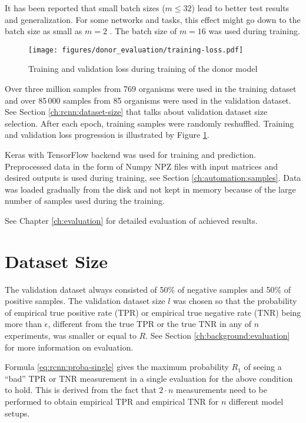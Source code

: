 It has been reported that small batch sizes ($m \le 32$) lead to better test
results and generalization. For some networks and tasks, this effect might go
down to the batch size as small as $m = 2$ \cite{masters2018revisitingb}. The
batch size of $m = 16$ was used during training.

\begin{figure}
  \centering
  \texttt{[image: figures/donor\_evaluation/training-loss.pdf]}
  \caption{Training and validation loss during training of the donor model}
  \label{fig:rcnn:training-loss}
\end{figure}

Over three million samples from 769 organisms were used in the training dataset
and over 85\,000 samples from 85 organisms were used in the validation dataset.
See Section \ref{ch:rcnn:dataset-size} that talks about validation dataset size
selection. After each epoch, training samples were randomly reshuffled.
Training and validation loss progression is illustrated by Figure
\ref{fig:rcnn:training-loss}.

Keras \cite{chollet2015keras} with TensorFlow \cite{abadi2016tensorflow}
backend was used for training and prediction. Preprocessed data in the form of
Numpy NPZ files with input matrices and desired outputs is used during
training, see Section \ref{ch:automation:samples}. Data was loaded gradually
from the disk and not kept in memory because of the large number of samples
used during the training.

See Chapter \ref{ch:evaluation} for detailed evaluation of achieved results.

\section{\label{ch:rcnn:dataset-size}Dataset Size}

The validation dataset always consisted of 50\% of negative samples and 50\% of
positive samples. The validation dataset size $l$ was chosen so that the
probability of empirical true positive rate (TPR) or empirical true negative
rate (TNR) being more than $\epsilon$, different from the true TPR or the true
TNR in any of $n$ experiments, was smaller or equal to $R$. See Section
\ref{ch:background:evaluation} for more information on evaluation.

Formula \ref{eq:rcnn:proba-single} gives the maximum probability $R_1$ of
seeing a “bad” TPR or TNR measurement in a single evaluation for the above
condition to hold. This is derived from the fact that $2 \cdot n$ measurements
need to be performed to obtain empirical TPR and empirical TNR for $n$
different model setups.

